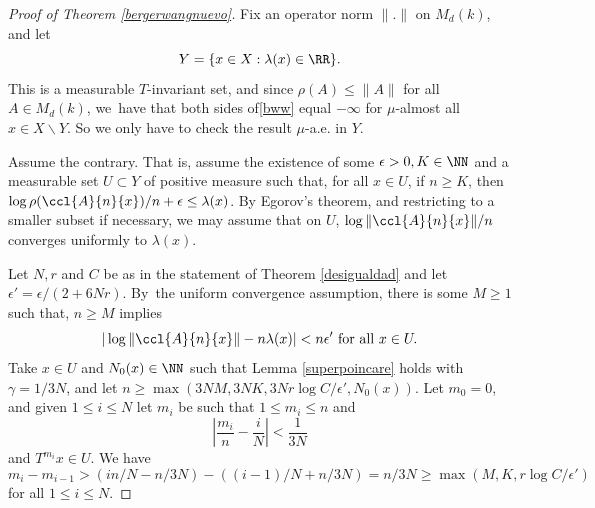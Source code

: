 \begin{proof}[Proof of Theorem \ref{bergerwangnuevo}]
Fix an operator norm $\|.\|$ on $M_{d}(k)$, and let
\[
Y=\{x\in X : \lambda(x)\in \RR\}.
\]
This is a measurable $T$-invariant set, and since $\rho(A)\leq \|A\|$ for all $A\in M_{d}(k)$, we~have that both sides of\eqref{bww} equal $-\infty$ for $\mu$-almost all $x\in X\backslash Y$. So we only have to check the result $\mu$-a.e. in $Y$.

Assume the contrary. That is, assume the existence of some $\epsilon>0, K\in \NN$ and a measurable set $U\subset Y$ of positive measure such that, for all $x\in U$, if $n\geq K$, then $\log{\rho(\ccl{A}{n}{x})}/n+\epsilon \leq \lambda(x)$.
By Egorov's theorem, and restricting to a smaller subset if necessary, we may assume that on $U$, $\log{\|\ccl{A}{n}{x}\|}/n$ converges uniformly to $\lambda(x)$.

Let $N,r$ and $C$ be as in the statement of Theorem \ref{desigualdad} and let $\epsilon'=\epsilon/(2+6Nr)$. By~the uniform convergence assumption, there is some $M\geq 1$ such that, $ n\geq M$ implies
\begin{equation}\label{necesaria1}
|\log{\|\ccl{A}{n}{x}\|}-n\lambda(x)|<n\epsilon' \text{ for all }x\in U.
\end{equation}
Take $x\in U$ and $N_0(x)\in \NN$ such that Lemma \ref{superpoincare} holds with $\gamma=1/3N$, and let $n\geq \max(3NM,3NK,3Nr\log{C}/\epsilon',N_0(x))$. Let $m_0=0$, and given $1\leq i\leq N$ let $m_i$ be such that $1\leq m_i \leq n$ and
\begin{equation}\label{fracrecu}
\left|\frac{m_i}{n}-\frac{i}{N}\right|<\frac{1}{3N}
\end{equation}
and $T^{m_i}x\in U$. We have
\[
m_{i}-m_{i-1}>(in/N-n/3N)-((i-1)/N+n/3N)=n/3N\geq \max(M,K,r\log{C}/\epsilon')
\]
for all $1\leq i\leq N$.


\end{proof}
